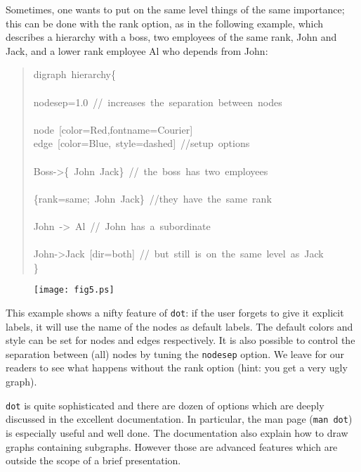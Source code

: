 \documentclass[10pt,english]{article}
\begin{document}
Sometimes, one wants to put on the same level things of the
same importance; this can be done with the rank option, as
in the following example, which describes a hierarchy with a boss,
two employees of the same rank, John and Jack, and a lower
rank employee Al who depends from John:
\begin{quote}
\begin{ttfamily}\begin{flushleft}
\mbox{digraph~hierarchy{\{}}\\
\mbox{}\\
\mbox{nodesep=1.0~//~increases~the~separation~between~nodes}\\
\mbox{}\\
\mbox{node~[color=Red,fontname=Courier]}\\
\mbox{edge~[color=Blue,~style=dashed]~//setup~options}\\
\mbox{}\\
\mbox{Boss->{\{}~John~Jack{\}}~//~the~boss~has~two~employees}\\
\mbox{}\\
\mbox{{\{}rank=same;~John~Jack{\}}~//they~have~the~same~rank}\\
\mbox{}\\
\mbox{John~->~Al~//~John~has~a~subordinate~}\\
\mbox{}\\
\mbox{John->Jack~[dir=both]~//~but~still~is~on~the~same~level~as~Jack}\\
\mbox{{\}}}
\end{flushleft}\end{ttfamily}
\end{quote}
\begin{figure}

\texttt{[image: fig5.ps]}
\end{figure}

This example shows a nifty feature of \texttt{dot}: if the user forgets
to give it explicit labels, it will use the name of the nodes as
default labels. The default colors and style can be set for nodes and 
edges respectively. It is also possible to control the separation 
between (all) nodes by tuning the \texttt{nodesep} option.
We leave for our readers to see what happens without the rank option
(hint: you get a very ugly graph).

\texttt{dot} is quite sophisticated and 
there are dozen of options which are deeply discussed in the excellent 
documentation. In particular, the man page (\texttt{man dot}) is especially 
useful and well done. The documentation also explain how to draw
graphs containing subgraphs. However those are advanced features which
are outside the scope of a brief presentation.
\end{document}
